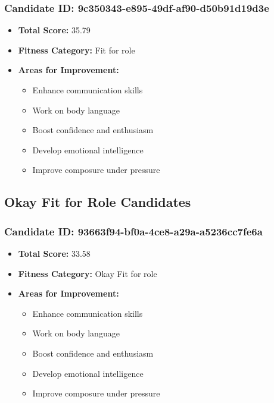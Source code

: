 \documentclass{article}
\begin{document}
\subsubsection{Candidate ID: 9c350343-e895-49df-af90-d50b91d19d3e}
\begin{itemize}
    \item \textbf{Total Score:} 35.79
    \item \textbf{Fitness Category:} Fit for role
    \item \textbf{Areas for Improvement:}
    \begin{itemize}
        \item Enhance communication skills
        \item Work on body language
        \item Boost confidence and enthusiasm
        \item Develop emotional intelligence
        \item Improve composure under pressure
    \end{itemize}
\end{itemize}

\subsection{Okay Fit for Role Candidates}

\subsubsection{Candidate ID: 93663f94-bf0a-4ce8-a29a-a5236cc7fe6a}
\begin{itemize}
    \item \textbf{Total Score:} 33.58
    \item \textbf{Fitness Category:} Okay Fit for role
    \item \textbf{Areas for Improvement:}
    \begin{itemize}
        \item Enhance communication skills
        \item Work on body language
        \item Boost confidence and enthusiasm
        \item Develop emotional intelligence
        \item Improve composure under pressure
    \end{itemize}
\end{itemize}
\end{document}
